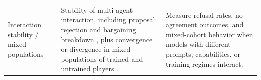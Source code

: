 {\begin{longtable}{@{}p{} p{} p{}@{}}
Interaction stability / mixed populations & Stability of multi-agent interaction, including proposal rejection and bargaining breakdown \citep{johnson2002detecting}, plus convergence or divergence in mixed populations of trained and untrained players \citep{johnson2002detecting}. & Measure refusal rates, no-agreement outcomes, and mixed-cohort behavior when models with different prompts, capabilities, or training regimes interact. \\
\end{longtable}
}
